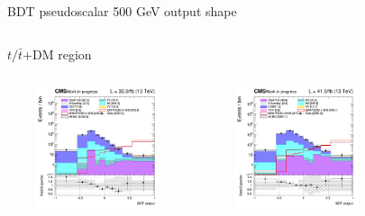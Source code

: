 \documentclass[8pt]{beamer}
\begin{document}
\begin{frame}{BDT pseudoscalar 500 GeV output shape}
\begin{columns}
\begin{column}{1.09\textwidth}
\begin{block}{\centering $t/\bar t$+DM region}\end{block} \vspace{10pt}
\end{column}
\end{columns} \vspace{-24pt}
\begin{columns}
		\begin{column}{0.33\textwidth}
			\begin{center}
			\begin{block}{}\end{block}	
     			\includegraphics[width=1.0\textwidth, height=100pt]{figs/2016/SmearSR-ttDM-pseudo500/log_cratio_ST_topCR_ll_BDT_ttDM500_ST_BDT_output_pseudoscalar500_customBinsAttempt7.png}
    		\end{center}		
		\end{column} 
		\begin{column}{0.33\textwidth}
			\begin{center}
			\begin{block}{}\end{block}	
     			\includegraphics[width=1.0\textwidth, height=100pt]{figs/2017/SmearSR-ttDM-pseudo500/log_cratio_ST_topCR_ll_BDT_ttDM500_ST_BDT_output_pseudoscalar500_customBinsAttempt7.png}
    		\end{center}		
		\end{column} 
		\begin{column}{0.33\textwidth}
			\begin{center}

\end{center}
\end{column}
\end{columns}
\end{frame}
\end{document}
